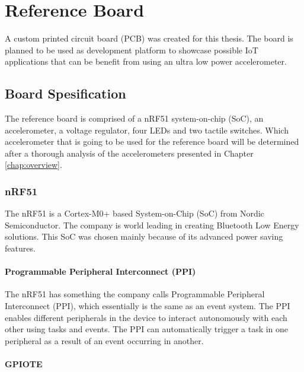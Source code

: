 \chapter{Reference Board}
\label{chap:reference}

A custom printed circuit board (PCB) was created for this thesis. The board is planned to be used as development platform to showcase possible IoT applications that can be benefit from using an ultra low power accelerometer. 

\section{Board Spesification}

The reference board is comprised of a nRF51 system-on-chip (SoC), an accelerometer, a voltage regulator, four LEDs and two tactile switches. Which accelerometer that is going to be used for the reference board will be determined after a thorough analysis of the accelerometers presented in Chapter \ref{chap:overview}.


\subsection{nRF51}

The nRF51 is a Cortex-M0+ based System-on-Chip (SoC) from Nordic Semiconductor. The company is world leading in creating Bluetooth Low Energy solutions. This SoC was chosen mainly because of its advanced power saving features. 

\subsubsection{Programmable Peripheral Interconnect (PPI)}

The nRF51 has something the company calls Programmable Peripheral Interconnect (PPI), which essentially is the same as an event system. The PPI enables different peripherals in the device to interact autonomously with each other using tasks and events. The PPI can automatically trigger a task in one peripheral as a result of an event occurring in another. 

\subsubsection{GPIOTE}

